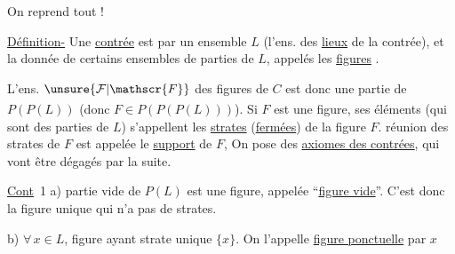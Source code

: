On reprend tout !

\uline{Définition-} Une \uline{contrée}  est  par un ensemble $L$ (l'ens. des \uline{lieux} de la contrée), et la donnée de certains ensembles de parties de $L$, appelés les \uline{figures} .

L'ens. $\unsure{\mathcal{F}|\mathscr{F}}$ des figures de $C$ est donc une  partie de $P(P(L))$ (donc $F\in P(P(P(L)))$). Si $F$ est une figure, ses éléments\textsuperscript{\unsure{$\times$/}} (qui sont des parties de $L$) s'appellent les \uline{strates} (\uline{fermées}) de la figure $F$.  réunion des strates  de $F$ est appelée le \uline{support} de $F$,  On pose des \uline{axiomes des contrées}, qui vont être dégagés par la suite.

\uline{Cont}~1 \quad a)  partie vide de $P(L)$ est une  figure, appelée ``\uline{figure vide}''. C'est donc la figure unique qui n'a pas de strates.

\margin{$\big\Vert$}
b) $\forall\,x\in L$,  figure ayant  strate unique $\{x\}$. On l'appelle \uline{figure ponctuelle}  par $x$
